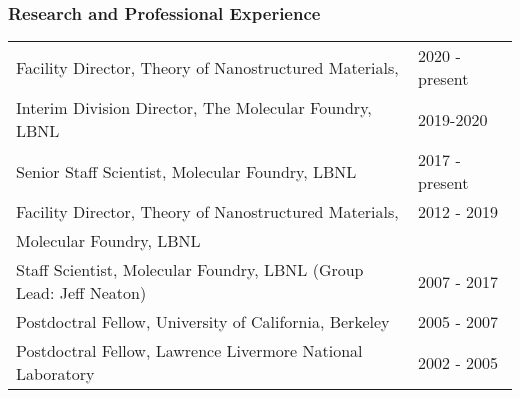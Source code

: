 \subsubsection*{Research and Professional Experience}

\begin{table}[ht]
    \centering
    \begin{tabular}{ll}
        Facility Director, Theory of Nanostructured Materials, & 2020 - present \\
        Interim Division Director, The Molecular Foundry, LBNL & 2019-2020 \\ 
    Senior Staff Scientist, Molecular Foundry, LBNL & 2017 - present    \\
        Facility Director, Theory of Nanostructured Materials, & 2012 - 2019 \\
        Molecular Foundry, LBNL & \\
        Staff Scientist, Molecular Foundry, LBNL (Group Lead: Jeff Neaton) & 2007 - 2017 \\
        Postdoctral Fellow, University of California, Berkeley & 2005 - 2007 \\
        Postdoctral Fellow, Lawrence Livermore National Laboratory & 2002 - 2005 \\
    \end{tabular}
\end{table}

